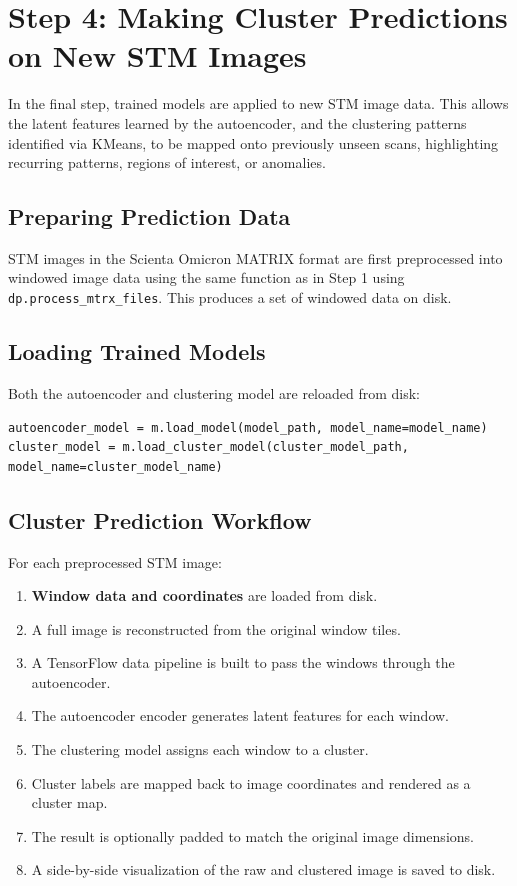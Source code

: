 \documentclass[11pt]{article}
\begin{document}
\section*{Step 4: Making Cluster Predictions on New STM Images}

In the final step, trained models are applied to new STM image data. This allows the latent features learned by the autoencoder, and the clustering patterns identified via KMeans, to be mapped onto previously unseen scans, highlighting recurring patterns, regions of interest, or anomalies.

\subsection*{Preparing Prediction Data}

STM images in the Scienta Omicron MATRIX format are first preprocessed into windowed image data using the same function as in Step 1 using \texttt{dp.process\_mtrx\_files}. This produces a set of windowed data on disk. 

\subsection*{Loading Trained Models}

Both the autoencoder and clustering model are reloaded from disk:

\begin{verbatim}
autoencoder_model = m.load_model(model_path, model_name=model_name)
cluster_model = m.load_cluster_model(cluster_model_path, model_name=cluster_model_name)
\end{verbatim}

\subsection*{Cluster Prediction Workflow}

For each preprocessed STM image:

\begin{enumerate}
  \item \textbf{Window data and coordinates} are loaded from disk.
  \item A full image is reconstructed from the original window tiles.
  \item A TensorFlow data pipeline is built to pass the windows through the autoencoder.
  \item The autoencoder encoder generates latent features for each window.
  \item The clustering model assigns each window to a cluster.
  \item Cluster labels are mapped back to image coordinates and rendered as a cluster map.
  \item The result is optionally padded to match the original image dimensions.
  \item A side-by-side visualization of the raw and clustered image is saved to disk.
\end{enumerate}
\end{document}

